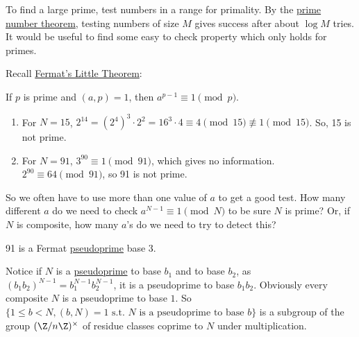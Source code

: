 \documentclass{article}
\begin{document}
To find a large prime, test numbers in a range for primality.
By the \hyperlink{thm:pnt}{prime number theorem}, testing numbers of size $M$ gives success after about $\log M$ tries.
It would be useful to find some easy to check property which only holds for primes.

Recall \hyperlink{thm:fermatLittle}{Fermat's Little Theorem}:
\begin{thm}
    If $p$ is prime and $(a, p)=1$, then $a^{p-1} \equiv 1 \pmod{p}$.
\end{thm}

\begin{eg}\leavevmode
    \begin{enumerate}[label={}]
        \item For $N=15$, $2^{14} = (2^4)^3 \cdot 2^2 = 16^3 \cdot 4 \equiv 4 \pmod{15} \not\equiv 1 \pmod{15}$. So, 15 is not prime.
        \item For $N=91$, $3^{90} \equiv 1 \pmod{91}$, which gives no information. $2^{90} \equiv 64 \pmod{91}$, so 91 is not prime.
    \end{enumerate}
\end{eg}

So we often have to use more than one value of $a$ to get a good test.
How many different $a$ do we need to check $a^{N-1} \equiv 1 \pmod{N}$ to be sure $N$ is prime?
Or, if $N$ is composite, how many $a$'s do we need to try to detect this?


\begin{eg}
    91 is a Fermat \hyperlink{def:pseudo}{pseudoprime} base 3.
\end{eg}

Notice if $N$ is a \hyperlink{def:pseudo}{pseudoprime} to base $b_1$ and to base $b_2$, as $(b_1 b_2)^{N-1} = b_1^{N-1} b_2^{N-1}$, it is a pseudoprime to base $b_1 b_2$.
Obviously every composite $N$ is a pseudoprime to base $1$.
So $\{1 \leq b < N, (b, N) = 1 \text{ s.t. $N$ is a pseudoprime to base } b\}$ is a subgroup of the group $(\Z/n\Z)^\times$ of residue classes coprime to $N$ under multiplication.
\end{document}
